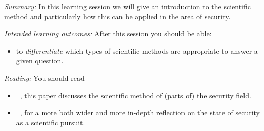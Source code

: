 \mode*


\emph{Summary:}
In this learning session we will give an introduction to the scientific method 
and particularly how this can be applied in the area of security.

\emph{Intended learning outcomes:}
After this session you should be able:
\begin{itemize}
  \item to \emph{differentiate} which types of scientific methods are 
    appropriate to answer a given question.
\end{itemize}


\emph{Reading:}
You should read 
\begin{itemize}
  \item 
    ~\cite{HowToDesignSecurityExperiments}, 
    this paper discusses the scientific method of (parts of) the security 
    field.
  \item {}~\cite{SecurityAsAScience}, for a more 
    both wider and more in-depth reflection on the state of security as a 
    scientific pursuit.
\end{itemize}
